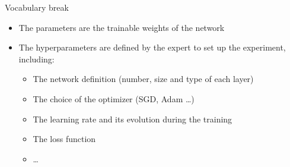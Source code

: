 \documentclass[usenames,dvipsnames]{beamer}
\begin{document}
    \begin{frame}{\secname}{\subsecname}
        Vocabulary break
        \begin{itemize}
            \item The \alert{parameters} are the trainable weights of the network
            \item The \alert{hyperparameters} are defined by the expert to set up the experiment, including:
            \begin{itemize}
                \item The network definition (number, size and type of each layer)
                \item The choice of the optimizer (SGD, Adam \dots)
                \item The learning rate and its evolution during the training
                \item The loss function
                \item \dots
            \end{itemize}
        \end{itemize}
    \end{frame}
\end{document}
